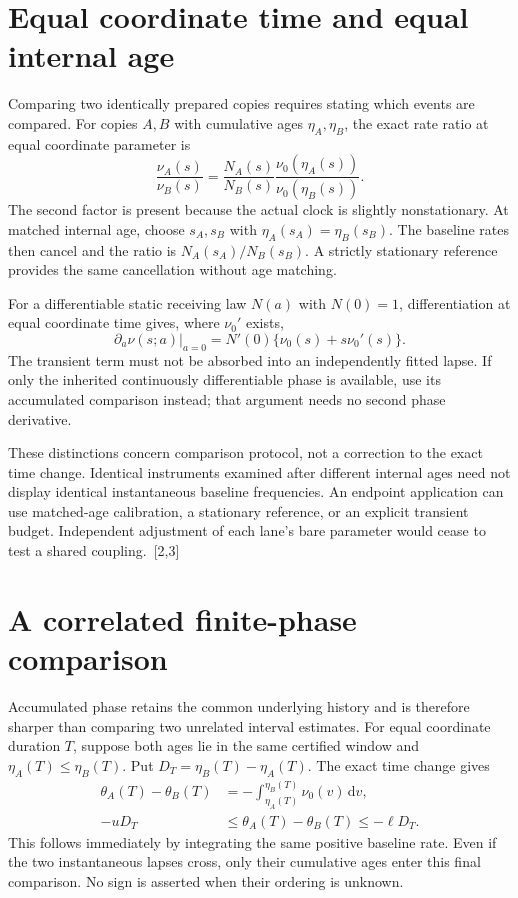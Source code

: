 \documentclass[10pt,twocolumn,letterpaper]{article}
\newcommand{\dd}{\mathrm{d}}
\begin{document}
\section{Equal coordinate time and equal internal age}
Comparing two identically prepared copies requires stating which events are compared. For copies $A,B$ with cumulative ages $\eta_A,\eta_B$, the exact rate ratio at equal coordinate parameter is
\[
 \frac{\nu_A(s)}{\nu_B(s)}
 =\frac{N_A(s)}{N_B(s)}
  \frac{\nu_0(\eta_A(s))}{\nu_0(\eta_B(s))}.
\]
The second factor is present because the actual clock is slightly nonstationary. At matched internal age, choose $s_A,s_B$ with $\eta_A(s_A)=\eta_B(s_B)$. The baseline rates then cancel and the ratio is $N_A(s_A)/N_B(s_B)$. A strictly stationary reference provides the same cancellation without age matching.

For a differentiable static receiving law $N(a)$ with $N(0)=1$, differentiation at equal coordinate time gives, where $\nu_0'$ exists,
\[
 \left.\partial_a\nu(s;a)\right|_{a=0}
 =N'(0)\{\nu_0(s)+s\nu_0'(s)\}.
\]
The transient term must not be absorbed into an independently fitted lapse. If only the inherited continuously differentiable phase is available, use its accumulated comparison instead; that argument needs no second phase derivative.

These distinctions concern comparison protocol, not a correction to the exact time change. Identical instruments examined after different internal ages need not display identical instantaneous baseline frequencies. An endpoint application can use matched-age calibration, a stationary reference, or an explicit transient budget. Independent adjustment of each lane's bare parameter would cease to test a shared coupling.~[2,3]


\section{A correlated finite-phase comparison}
Accumulated phase retains the common underlying history and is therefore sharper than comparing two unrelated interval estimates. For equal coordinate duration $T$, suppose both ages lie in the same certified window and $\eta_A(T)\le\eta_B(T)$. Put $D_T=\eta_B(T)-\eta_A(T)$. The exact time change gives
\[
\begin{aligned}
 \theta_A(T)-\theta_B(T)
 &=-\int_{\eta_A(T)}^{\eta_B(T)}\nu_0(v)\,\dd v,\\
 -uD_T&\le\theta_A(T)-\theta_B(T)\le-\ell D_T.
\end{aligned}
\]
This follows immediately by integrating the same positive baseline rate. Even if the two instantaneous lapses cross, only their cumulative ages enter this final comparison. No sign is asserted when their ordering is unknown.
\end{document}
